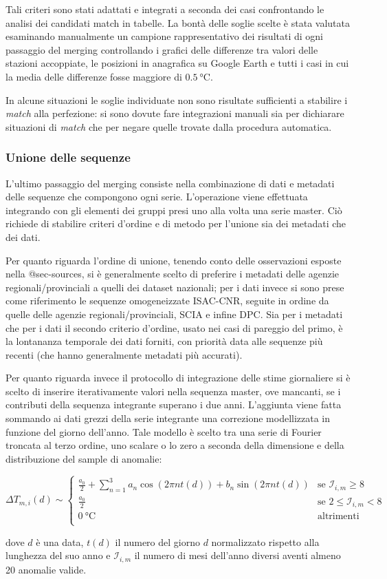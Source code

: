 Tali criteri sono stati adattati e integrati a seconda dei casi confrontando le analisi dei candidati match in tabelle. La bontà delle soglie scelte è stata valutata esaminando manualmente un campione rappresentativo dei risultati di ogni passaggio del merging controllando i grafici delle differenze tra valori delle stazioni accoppiate, le posizioni in anagrafica su Google Earth e tutti i casi in cui la media delle differenze fosse maggiore di \(\qty{0.5}{\degreeCelsius}\).

In alcune situazioni le soglie individuate non sono risultate sufficienti a stabilire i \emph{match} alla perfezione: si sono dovute fare integrazioni manuali sia per dichiarare situazioni di \emph{match} che per negare quelle trovate dalla procedura automatica.

\subsubsection{Unione delle sequenze}
L'ultimo passaggio del merging consiste nella combinazione di dati e metadati delle sequenze che compongono ogni serie. L'operazione viene effettuata integrando con gli elementi dei gruppi presi uno alla volta una serie master. Ciò richiede di stabilire criteri d'ordine e di metodo per l'unione sia dei metadati che dei dati.

Per quanto riguarda l'ordine di unione, tenendo conto delle osservazioni esposte nella @sec-sources, si è generalmente scelto di preferire i metadati delle agenzie regionali/provinciali a quelli dei dataset nazionali; per i dati invece si sono prese come riferimento le sequenze omogeneizzate ISAC-CNR, seguite in ordine da quelle delle agenzie regionali/provinciali, SCIA e infine DPC. Sia per i metadati che per i dati il secondo criterio d'ordine, usato nei casi di pareggio del primo, è la lontananza temporale dei dati forniti, con priorità data alle sequenze più recenti (che hanno generalmente metadati più accurati).

Per quanto riguarda invece il protocollo di integrazione delle stime giornaliere si è scelto di inserire iterativamente valori nella sequenza master, ove mancanti, se i contributi della sequenza integrante superano i due anni. L'aggiunta viene fatta sommando ai dati grezzi della serie integrante una correzione modellizzata in funzione del giorno dell'anno. Tale modello è scelto tra una serie di Fourier troncata al terzo ordine, uno scalare o lo zero a seconda della dimensione e della distribuzione del sample di anomalie:

\[
  \Delta T_{m,i}(d) \sim
  \begin{cases}
    \frac{a_0}{2} + \sum^3_{n=1} a_n \cos( 2\pi n t(d)) + b_n\sin(2\pi n t(d)) & \text{se } \mathcal{I}_{i,m} \ge 8 \\
    \frac{a_0}{2} & \text{se } 2 \le \mathcal{I}_{i,m} < 8 \\
    \qty{0}{\degreeCelsius} & \text{altrimenti} \\
  \end{cases}
\]

dove \(d\) è una data, \(t(d)\) il numero del giorno \(d\) normalizzato rispetto alla lunghezza del suo anno e \(\mathcal{I}_{i,m}\) il numero di mesi dell'anno diversi aventi almeno 20 anomalie valide.
